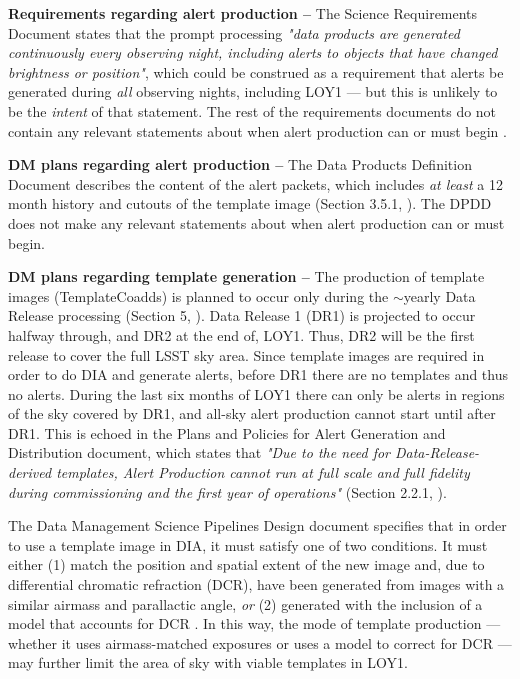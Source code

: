\documentclass[DM,lsstdraft,toc]{lsstdoc}
\begin{document}
{\bf Requirements regarding alert production --} The Science Requirements Document  states that the prompt processing {\it "data products are generated continuously every observing night, including alerts to objects that have changed brightness or position"}, which could be construed as a requirement that alerts be generated during {\it all} observing nights, including LOY1 --- but this is unlikely to be the {\em intent} of that statement. The rest of the requirements documents do not contain any relevant statements about when alert production can or must begin .

{\bf DM plans regarding alert production --} The Data Products Definition Document describes the content of the alert packets, which includes {\em at least} a 12 month history and cutouts of the template image (Section 3.5.1, ). The DPDD does not make any relevant statements about when alert production can or must begin.

{\bf DM plans regarding template generation --} The production of template images (TemplateCoadds) is planned to occur only during the $\sim$yearly Data Release processing (Section 5, ). Data Release 1 (DR1) is projected to occur halfway through, and DR2 at the end of, LOY1. Thus, DR2 will be the first release to cover the full LSST sky area. Since template images are required in order to do DIA and generate alerts, before DR1 there are no templates and thus no alerts. During the last six months of LOY1 there can only be alerts in regions of the sky covered by DR1, and all-sky alert production cannot start until after DR1. This is echoed in the Plans and Policies for Alert Generation and Distribution document, which states that {\it "Due to the need for Data-Release-derived templates, Alert Production cannot run at full scale and full fidelity during commissioning and the first year of operations"} (Section 2.2.1, ).

The Data Management Science Pipelines Design document specifies that in order to use a template image in DIA, it must satisfy one of two conditions. It must either (1) match the position and spatial extent of the new image and, due to differential chromatic refraction (DCR), have been generated from images with a similar airmass and parallactic angle, {\em or} (2) generated with the inclusion of a model that accounts for DCR . In this way, the mode of template production --- whether it uses airmass-matched exposures or uses a model to correct for DCR --- may further limit the area of sky with viable templates in LOY1.
\end{document}
